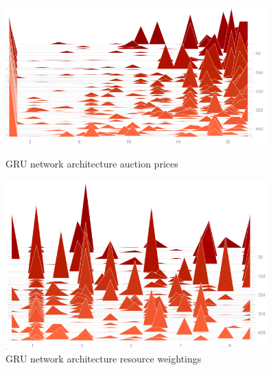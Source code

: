 \begin{figure}
    \centering
    \begin{minipage}{0.45\textwidth}
        \centering
        \includegraphics[width=0.9\textwidth]{figures/net_arch_training_fig/gru_architecture_auction_prices.png}
        \caption{GRU network architecture auction prices}
        \label{fig:gru-auction-prices}
    \end{minipage}\hfill
    \begin{minipage}{0.45\textwidth}
        \centering
        \includegraphics[width=0.9\textwidth]{figures/net_arch_training_fig/gru_architecture_weightings.png}
        \caption{GRU network architecture resource weightings}
        \label{fig:gru-resource-weightings}
    \end{minipage}
\end{figure}

